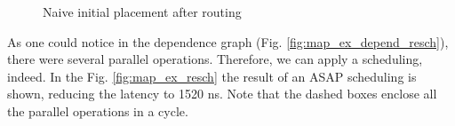 \begin{figure}[H]
{{
}

}
\label{fig:map_ex_depend_resch}

\label{fig:map_ex_routing}
\caption{Naive initial placement after routing}
\end{figure}
As one could notice in the dependence graph (Fig. \ref{fig:map_ex_depend_resch}), there were several parallel operations.
Therefore, we can apply a scheduling, indeed.
In the Fig. \ref{fig:map_ex_resch} the result of an ASAP scheduling is shown, reducing the latency to 1520 ns.
Note that the dashed boxes enclose all the parallel operations in a cycle.



